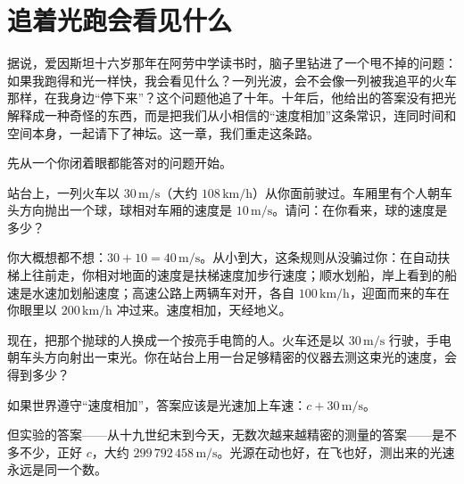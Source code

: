 \chapter{追着光跑会看见什么}

据说，爱因斯坦十六岁那年在阿劳中学读书时，脑子里钻进了一个甩不掉的问题：如果我跑得和光一样快，我会看见什么？一列光波，会不会像一列被我追平的火车那样，在我身边“停下来”？这个问题他追了十年。十年后，他给出的答案没有把光解释成一种奇怪的东西，而是把我们从小相信的“速度相加”这条常识，连同时间和空间本身，一起请下了神坛。这一章，我们重走这条路。


先从一个你闭着眼都能答对的问题开始。

站台上，一列火车以 \(30\,\mathrm{m/s}\)（大约 \(108\,\mathrm{km/h}\)）从你面前驶过。车厢里有个人朝车头方向抛出一个球，球相对车厢的速度是 \(10\,\mathrm{m/s}\)。请问：在你看来，球的速度是多少？

\begin{center}
\end{center}

你大概想都不想：\(30+10=40\,\mathrm{m/s}\)。从小到大，这条规则从没骗过你：在自动扶梯上往前走，你相对地面的速度是扶梯速度加步行速度；顺水划船，岸上看到的船速是水速加划船速度；高速公路上两辆车对开，各自 \(100\,\mathrm{km/h}\)，迎面而来的车在你眼里以 \(200\,\mathrm{km/h}\) 冲过来。速度相加，天经地义。

现在，把那个抛球的人换成一个按亮手电筒的人。火车还是以 \(30\,\mathrm{m/s}\) 行驶，手电朝车头方向射出一束光。你在站台上用一台足够精密的仪器去测这束光的速度，会得到多少？

如果世界遵守“速度相加”，答案应该是光速加上车速：\(c+30\,\mathrm{m/s}\)。

但实验的答案——从十九世纪末到今天，无数次越来越精密的测量的答案——是不多不少，正好 \(c\)，大约 \(299\,792\,458\,\mathrm{m/s}\)。光源在动也好，在飞也好，测出来的光速永远是同一个数。

